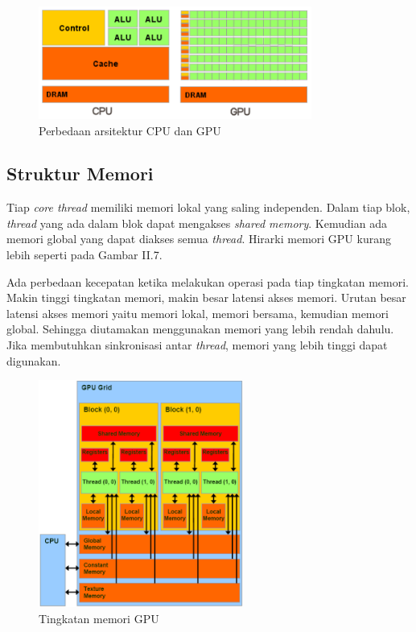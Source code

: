     
    \begin{figure}[htb]
      \centering
      \includegraphics[width=0.8\textwidth]{resources/GPUvsCPU.png}
      \caption[Perbedaan arsitektur CPU dan GPU]{Perbedaan arsitektur CPU dan GPU \citep{cuda}}
    \end{figure}
    

  \subsection{Struktur Memori}
    
    Tiap \emph{core thread} memiliki memori lokal yang saling independen. Dalam tiap blok, \emph{thread} yang ada dalam blok dapat mengakses \emph{shared memory}. Kemudian ada memori global yang dapat diakses semua \emph{thread}. Hirarki memori GPU kurang lebih seperti pada Gambar II.7.
    
    Ada perbedaan kecepatan ketika melakukan operasi pada tiap tingkatan memori. Makin tinggi tingkatan memori, makin besar latensi akses memori. Urutan besar latensi akses memori yaitu memori lokal, memori bersama, kemudian memori global. Sehingga diutamakan menggunakan memori yang lebih rendah dahulu. Jika membutuhkan sinkronisasi antar \emph{thread}, memori yang lebih tinggi dapat digunakan. 
    
    \begin{figure}[htb]
      \centering
      \includegraphics[width=0.6\textwidth]{resources/cudamem.png}
      \caption[Tingkatan memori GPU]{Tingkatan memori GPU \citep{cuda}}
    \end{figure}

